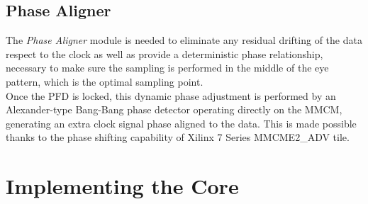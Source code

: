 \documentclass[11pt]{article}
\renewcommand{\>}{\rangle} \renewcommand{\emptyset}{\varnothing}
\begin{document}
\subsection{Phase Aligner}
The \textit{Phase Aligner} module is needed to eliminate any residual drifting
of the data respect to the clock as well as provide a deterministic phase
relationship, necessary to make sure the sampling is performed in the middle of
the eye pattern, which is the optimal sampling point.\\
Once the PFD is locked, this dynamic phase adjustment is performed by an
Alexander-type Bang-Bang phase detector operating directly on the MMCM,
generating an extra clock signal phase aligned to the data. This is made
possible thanks to the phase shifting capability of Xilinx 7 Series MMCME2\_ADV
tile.

\section{Implementing the Core}
\end{document}
